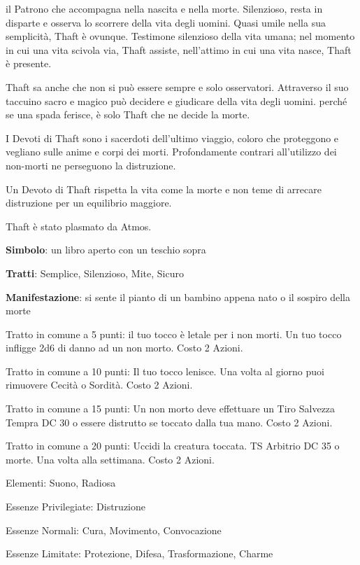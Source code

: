 \documentclass[a4paper,11pt,twoside,openany]{book}
\begin{document}
{\label{thaft}

il Patrono che accompagna nella nascita e nella morte. Silenzioso, resta in disparte e osserva lo scorrere della vita degli uomini. Quasi umile nella sua semplicità, Thaft è ovunque. Testimone silenzioso della vita umana; nel momento in cui una vita scivola via, Thaft assiste, nell'attimo in cui una vita nasce, Thaft è presente.

Thaft sa anche che non si può essere sempre e solo osservatori. Attraverso il suo taccuino sacro e magico può decidere e giudicare della vita degli uomini. perché se una spada ferisce, è solo Thaft che ne decide la morte.

I Devoti di Thaft sono i sacerdoti dell'ultimo viaggio, coloro che proteggono e vegliano sulle anime e corpi dei morti. Profondamente contrari all'utilizzo dei non-morti ne perseguono la distruzione.

Un Devoto di Thaft rispetta la vita come la morte e non teme di arrecare distruzione per un equilibrio maggiore.

Thaft è stato plasmato da Atmos.

\textbf{Simbolo}: un libro aperto con un teschio sopra

\textbf{Tratti}: Semplice, Silenzioso, Mite, Sicuro

\textbf{Manifestazione}: si sente il pianto di un bambino appena nato o il sospiro della morte

\bigskip

Tratto in comune a 5 punti: il tuo tocco è letale per i non morti. Un tuo tocco infligge 2d6 di danno ad un non morto. Costo 2 Azioni.

Tratto in comune a 10 punti: Il tuo tocco lenisce. Una volta al giorno puoi rimuovere Cecità o Sordità. Costo 2 Azioni.

Tratto in comune a 15 punti: Un non morto deve effettuare un Tiro Salvezza Tempra DC 30 o essere distrutto se toccato dalla tua mano. Costo 2 Azioni.

Tratto in comune a 20 punti: Uccidi la creatura toccata. TS Arbitrio DC 35 o morte. Una volta alla settimana. Costo 2 Azioni.

\bigskip

Elementi: Suono, Radiosa

\bigskip

Essenze Privilegiate: Distruzione

Essenze Normali: Cura, Movimento, Convocazione

Essenze Limitate: Protezione, Difesa, Trasformazione, Charme

}
\end{document}
